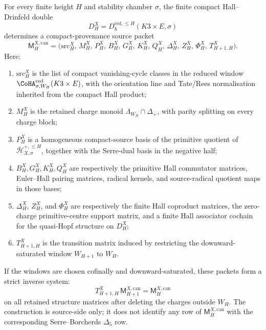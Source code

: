 \begin{theorem}
\label{thm:k3e-canonical-finite-source-packets}
For every finite height \(H\) and stability chamber \(\sigma\), the
finite compact Hall--Drinfeld double
\[
 D_H^X=
 D^{\mathrm{red},\leq H}_{\hbar}(K3\times E,\sigma)
\]
determines a compact-provenance source packet
\[
 \mathsf M_H^{X,\mathrm{can}}
 =
 \bigl(
 \mathrm{src}_H^X,\,
 M_H^X,\,
 P_H^X,\,
 B_H^X,\,
 G_H^X,\,
 K_H^X,\,
 Q_H^X,\,
 \Delta_H^X,\,
 Z_H^X,\,
 \Phi_H^X,\,
 T_{H+1,H}^X
 \bigr).
\]
Here:
\begin{enumerate}[label=\textup{(\roman*)}]
\item \(\mathrm{src}_H^X\) is the list of compact
vanishing-cycle classes in the reduced window
\(\CoHA_{\sigma,W_H}^{\mathrm{red}}(K3\times E)\), with the
orientation line and Tate/Rees normalisation inherited from the compact
Hall product;
\item \(M_H^X\) is the retained charge monoid
\(\Lambda_{W_H}\cap \Delta_+\), with parity splitting on every charge
block;
\item \(P_H^X\) is a homogeneous compact-source basis of the primitive
quotient of \(\overline{\mathcal H}^{+,\leq H}_{X,\sigma}\), together
with the Serre-dual basis in the negative half;
\item \(B_H^X,G_H^X,K_H^X,Q_H^X\) are respectively the primitive Hall
commutator matrices, Euler--Hall pairing matrices, radical kernels, and
source-radical quotient maps in those bases;
\item \(\Delta_H^X\), \(Z_H^X\), and \(\Phi_H^X\) are respectively the
finite Hall coproduct matrices, the zero-charge primitive-centre
support matrix, and a finite Hall associator cochain for the
quasi-Hopf structure on \(D_H^X\);
\item \(T_{H+1,H}^X\) is the transition matrix induced by restricting
the downward-saturated window \(W_{H+1}\) to \(W_H\).
\end{enumerate}
If the windows are chosen cofinally and downward-saturated, these
packets form a strict inverse system:
\[
 T_{H+1,H}^X\,\mathsf M_{H+1}^{X,\mathrm{can}}
 =
 \mathsf M_H^{X,\mathrm{can}}
\]
on all retained structure matrices after deleting the charges outside
\(W_H\). The construction is source-side only; it does not identify any
row of \(\mathsf M_H^{X,\mathrm{can}}\) with the corresponding
Serre--Borcherds \(\Delta_5\) row.
\end{theorem}

